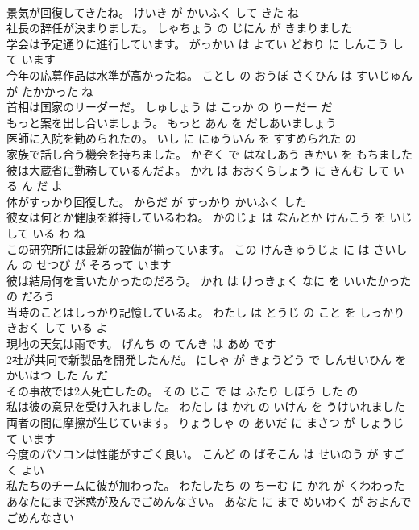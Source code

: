 \documentclass[8pt]{extreport}
\begin{document}
\begin{CJK}{UTF8}{min}
\\	景気が回復してきたね。	けいき が かいふく して きた ね 
\\	社長の辞任が決まりました。	しゃちょう の じにん が きまりました 
\\	学会は予定通りに進行しています。	がっかい は よてい どおり に しんこう して います 
\\	今年の応募作品は水準が高かったね。	ことし の おうぼ さくひん は すいじゅん が たかかった ね 
\\	首相は国家のリーダーだ。	しゅしょう は こっか の りーだー だ 
\\	もっと案を出し合いましょう。	もっと あん を だしあいましょう 
\\	医師に入院を勧められたの。	いし に にゅういん を すすめられた の 
\\	家族で話し合う機会を持ちました。	かぞく で はなしあう きかい を もちました 
\\	彼は大蔵省に勤務しているんだよ。	かれ は おおくらしょう に きんむ して いる ん だ よ 
\\	体がすっかり回復した。	からだ が すっかり かいふく した 
\\	彼女は何とか健康を維持しているわね。	かのじょ は なんとか けんこう を いじ して いる わ ね 
\\	この研究所には最新の設備が揃っています。	この けんきゅうじょ に は さいしん の せつび が そろって います 
\\	彼は結局何を言いたかったのだろう。	かれ は けっきょく なに を いいたかった の だろう 
\\	当時のことはしっかり記憶しているよ。	わたし は とうじ の こと を しっかり きおく して いる よ 
\\	現地の天気は雨です。	げんち の てんき は あめ です 
\\	2社が共同で新製品を開発したんだ。	にしゃ が きょうどう で しんせいひん を かいはつ した ん だ 
\\	その事故では2人死亡したの。	その じこ で は ふたり しぼう した の 
\\	私は彼の意見を受け入れました。	わたし は かれ の いけん を うけいれました 
\\	両者の間に摩擦が生じています。	りょうしゃ の あいだ に まさつ が しょうじて います 
\\	今度のパソコンは性能がすごく良い。	こんど の ぱそこん は せいのう が すごく よい 
\\	私たちのチームに彼が加わった。	わたしたち の ちーむ に かれ が くわわった 
\\	あなたにまで迷惑が及んでごめんなさい。	あなた に まで めいわく が およんで ごめんなさい 

\end{CJK}
\end{document}
